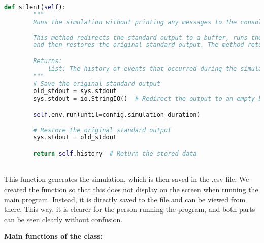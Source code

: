 \documentclass[a4paper,12pt]{article}
\begin{document}
\begin{lstlisting}[language=Python]
def silent(self):
        """
        Runs the simulation without printing any messages to the console.
        
        This method redirects the standard output to a buffer, runs the simulation for a period of time,
        and then restores the original standard output. The method returns the simulation history data.

        Returns:
            list: The history of events that occurred during the simulation.
        """
        # Save the original standard output
        old_stdout = sys.stdout  
        sys.stdout = io.StringIO()  # Redirect the output to an empty buffer

        self.env.run(until=config.simulation_duration)
        
        # Restore the original standard output
        sys.stdout = old_stdout  

        return self.history  # Return the stored data

\end{lstlisting}
\\
This function generates the simulation, which is then saved in the .csv file. We created the function so that this does not display on the screen when running the main program. Instead, it is directly saved to the file and can be viewed from there. This way, it is clearer for the person running the program, and both parts can be seen clearly without confusion.\newline

\textbf{Main functions of the class:}
\end{document}

